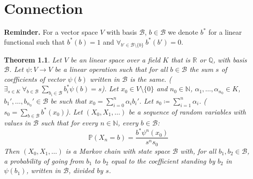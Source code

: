 \documentclass[a4paper, 12pt]{report}
\newtheorem{theorem}{Theorem}
\begin{document}
\chapter{Connection}
\textbf{Reminder. } For a vector space $V$ with basis $\mathcal{B}$,
$b \in \mathcal{B}$ we denote $b^*$
for a linear functional such that $b^*(b) = 1$ and
$\forall_{b' \in \mathcal{B}\setminus \{b\}}\ b^*(b') = 0$.
\begin{theorem}
Let $V$ be an linear space over a field $K$ that is $\mathbb{R}$ or $\mathbb{Q}$,
 with basis $\mathcal{B}$.
Let $\psi : V \to V$ be a linear operation such that for
all $b \in \mathcal{B}$ the sum $s$ of coefficients of vector $\psi(b)$ written in $\mathcal{B}$ is the same.
($\exists_{s \in K}\ \forall_{b \in \mathcal{B}}\ \displaystyle\sum_{b_i \in \mathcal{B}}b_i^*\psi(b) = s$).
Let $x_0 \in V\setminus\{0\}$ and $n_0 \in \mathbb{N}$, $\alpha_1, \dots, \alpha_{n_0} \in K$, $b_1', \dots, b_{n_0}' \in \mathcal{B}$
be such that $x_0 = \displaystyle\sum_{i = 0}^n \alpha_i b_i'$. Let $s_0 \coloneqq
\displaystyle\sum_{i = 1}^n \alpha_i$. ($s_0 = \displaystyle\sum_{b \in \mathcal{B}} b^*(x_0)$).
Let $(X_0, X_1, \dots)$ be a sequence
of random variables with values in $\mathcal{B}$ such that for every $n \in \mathbb{N}$, every
$b \in \mathcal{B}$:
\begin{equation*}
\mathbb{P}(X_n = b) = \frac{b^*\psi^n(x_0)}{s^ns_0}
\end{equation*}
Then $(X_0, X_1, \dots)$ is a Markov chain with state space $\mathcal{B}$
with, for all $b_1, b_2 \in \mathcal{B}$, a probability of going from $b_1$ to $b_2$ equal to the
coefficient standing by $b_2$ in $\psi(b_1)$, written in $\mathcal{B}$, divided by $s$.
\end{theorem}
\end{document}
